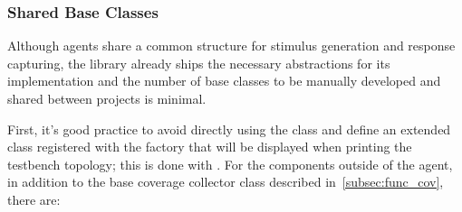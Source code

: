 \subsubsection{Shared Base Classes}
Although agents share a common structure for stimulus generation and response capturing, the \uvm library already ships the necessary abstractions for its implementation and the number of base classes to be manually developed and shared between projects is minimal. 
 
First, it's good practice to avoid directly using the  class and define an extended class registered with the factory that will be displayed when printing the testbench topology; this is done with .
For the components outside of the agent, in addition to the base coverage collector class described in~\cref{subsec:func_cov}, there are:
